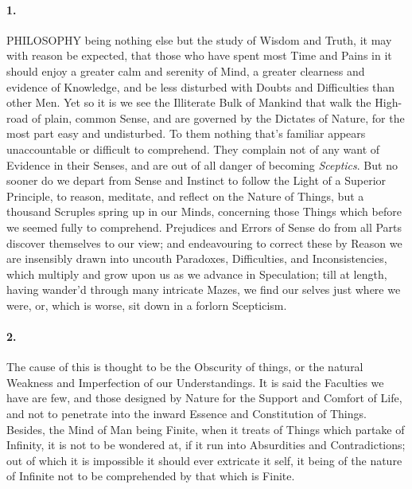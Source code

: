 \documentclass[]{article}
\newenvironment{sectionbody}{}{}
\begin{document}
\begin{sectionbody}

\paragraph{1.} PHILOSOPHY being nothing else but the study of Wisdom and Truth,
it may with reason be expected, that those who have spent most
Time and Pains in it should enjoy a greater calm and serenity of
Mind, a greater clearness and evidence of Knowledge, and be less
disturbed with Doubts and Difficulties than other Men.  Yet so it
is we see the Illiterate Bulk of Mankind that walk the High-road
of plain, common Sense, and are governed by the Dictates of
Nature, for the most part easy and undisturbed.  To them nothing
that's familiar appears unaccountable or difficult to comprehend.
They complain not of any want of Evidence in their Senses, and
are out of all danger of becoming \emph{Sceptics}.  But no
sooner do we depart from Sense and Instinct to follow the Light
of a Superior Principle, to reason, meditate, and reflect on the
Nature of Things, but a thousand Scruples spring up in our Minds,
concerning those Things which before we seemed fully to
comprehend.  Prejudices and Errors of Sense do from all Parts
discover themselves to our view; and endeavouring to correct
these by Reason we are insensibly drawn into uncouth Paradoxes,
Difficulties, and Inconsistencies, which multiply and grow upon
us as we advance in Speculation; till at length, having wander'd
through many intricate Mazes, we find our selves just where we
were, or, which is worse, sit down in a forlorn Scepticism.



\paragraph{2.} The cause of this is thought to be the Obscurity of things, or
the natural Weakness and Imperfection of our Understandings.  It
is said the Faculties we have are few, and those designed by
Nature for the Support and Comfort of Life, and not to penetrate
into the inward Essence and Constitution of Things.  Besides, the
Mind of Man being Finite, when it treats of Things which partake
of Infinity, it is not to be wondered at, if it run into
Absurdities and Contradictions; out of which it is impossible it
should ever extricate it self, it being of the nature of Infinite
not to be comprehended by that which is Finite.




\end{sectionbody}
\end{document}
